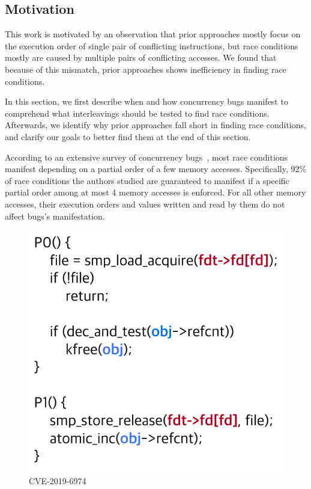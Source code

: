 \subsection{Motivation}
\label{ss:motivation}

This work is motivated by an observation that prior approaches mostly
focus on the execution order of single pair of conflicting
instructions, but race conditions mostly are caused by multiple pairs
of conflicting accesses.
%
We found that because of this mismatch, prior approaches shows
inefficiency in finding race conditions.

In this section, we first describe when and how concurrency bugs
manifest to comprehend what interleavings should be tested to find
race conditions.
%
Afterwards, we identify why prior approaches fall short in finding
race conditions, and clarify our goals to better find them at the end
of this section.




%
According to an extensive survey of concurrency
bugs~\cite{learningfrommistakes}, most race conditions manifest
depending on a partial order of a few memory accesses.
%
Specifically, 92\% of race conditions the authors studied are
guaranteed to manifest if a specific partial order among at most 4
memory accesses is enforced.
%
For all other memory accesses, their execution orders and values
written and read by them do not affect bugs's manifestation.

\begin{figure}
  \centering
  \includegraphics[width=0.9\linewidth]{fig/racecondition.pdf}
  \caption{CVE-2019-6974}
  \label{fig:racecondition}
\end{figure}  


